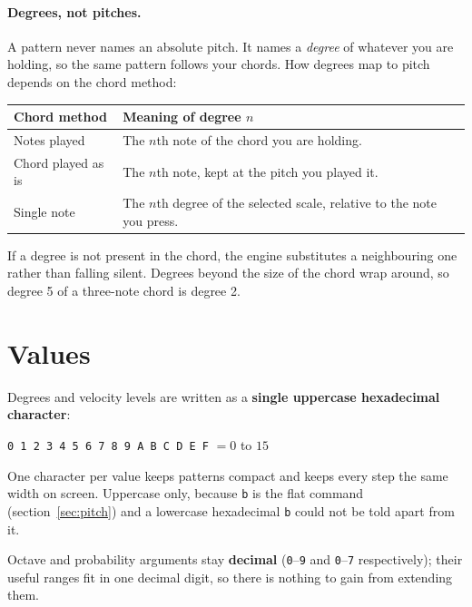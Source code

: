 \documentclass[11pt,a4paper]{article}
\newcommand{\pat}[1]{\texttt{#1}}
\begin{document}
\paragraph{Degrees, not pitches.} A pattern never names an absolute pitch. It
names a \emph{degree} of whatever you are holding, so the same pattern follows
your chords. How degrees map to pitch depends on the chord method:

\begin{center}
\begin{tabular}{@{}lp{95mm}@{}}
\toprule
\textbf{Chord method} & \textbf{Meaning of degree $n$}\\
\midrule
Notes played        & The $n$th note of the chord you are holding.\\
Chord played as is  & The $n$th note, kept at the pitch you played it.\\
Single note         & The $n$th degree of the selected scale, relative to the
                      note you press.\\
\bottomrule
\end{tabular}
\end{center}

If a degree is not present in the chord, the engine substitutes a neighbouring
one rather than falling silent. Degrees beyond the size of the chord wrap
around, so degree 5 of a three-note chord is degree 2.

\section{Values}
\label{sec:values}

Degrees and velocity levels are written as a \textbf{single uppercase
hexadecimal character}:

\begin{center}
\pat{0 1 2 3 4 5 6 7 8 9 A B C D E F} \quad$=$\quad $0$ to $15$
\end{center}

One character per value keeps patterns compact and keeps every step the same
width on screen. Uppercase only, because \pat{b} is the flat command
(section~\ref{sec:pitch}) and a lowercase hexadecimal \pat{b} could not be told
apart from it.

Octave and probability arguments stay \textbf{decimal} (\pat{0}--\pat{9} and
\pat{0}--\pat{7} respectively); their useful ranges fit in one decimal digit,
so there is nothing to gain from extending them.
\end{document}

